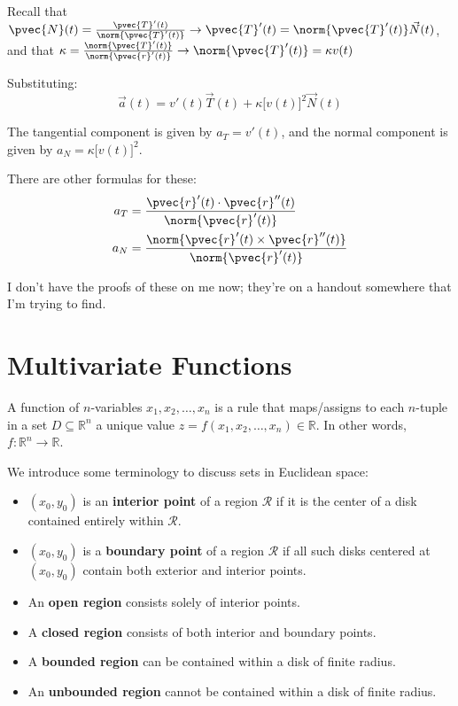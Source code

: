 \documentclass[12pt]{article}
\begin{document}
\begin{enumerate}
Recall that $\pvec{N}(t) = \frac{\pvec{T}'(t)}{\norm{\pvec{T}'(t)}} \rightarrow \pvec{T}'(t) = \norm{\pvec{T}'(t)}\vec{N}(t)$, and that $\kappa = \frac{\norm{\pvec{T}'(t)}}{\norm{\pvec{r}'(t)}} \rightarrow \norm{\pvec{T}'(t)} = \kappa v(t)$ 

Substituting: \[ \vec{a}(t) = v'(t)\vec{T}(t) + \kappa{[}v(t){]}^2\vec{N}(t) \]

The tangential component is given by $a_T = v'(t)$, and the normal component is given by $a_N = \kappa{[}v(t){]}^2$. 

There are other formulas for these:
\[
\begin{aligned}
a_T &= \frac{\pvec{r}'(t) \cdot \pvec{r}''(t)}{\norm{\pvec{r}'(t)}} \\
a_N &= \frac{\norm{\pvec{r}'(t) \times \pvec{r}''(t)}}{\norm{\pvec{r}'(t)}}
\end{aligned}
\]

I don't have the proofs of these on me now; they're on a handout somewhere that I'm trying to find.

\section{Multivariate Functions}
A function of $n$-variables $x_1,x_2,\dots,x_n$ is a rule that maps/assigns to each $n$-tuple in a set $D \subseteq \mathbb{R}^n$ a unique value $z = f(x_1,x_2,\dots,x_n) \in \mathbb{R}$. In other words, $f:\mathbb{R}^n \rightarrow \mathbb{R}$.

We introduce some terminology to discuss sets in Euclidean space:
\begin{itemize}
\item $(x_0,y_0)$ is an \textbf{interior point} of a region $\mathcal{R}$ if it is the center of a disk contained entirely within $\mathcal{R}$.
\item $(x_0,y_0)$ is a \textbf{boundary point} of a region $\mathcal{R}$ if all such disks centered at $(x_0,y_0)$ contain both exterior and interior points.
\item An \textbf{open region} consists solely of interior points.
\item A \textbf{closed region} consists of both interior and boundary points.
\item A \textbf{bounded region} can be contained within a disk of finite radius.
\item An \textbf{unbounded region} cannot be contained within a disk of finite radius.
\end{itemize}


\end{enumerate}
\end{document}
